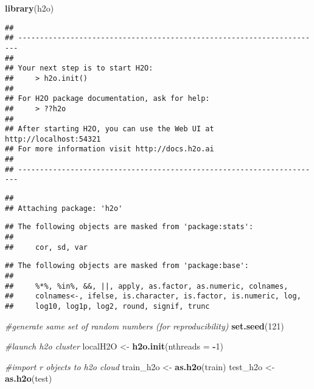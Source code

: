 \documentclass[]{article}
\newenvironment{Shaded}{\begin{snugshade}}{\end{snugshade}}
\newcommand{\KeywordTok}[1]{\textcolor[rgb]{0.13,0.29,0.53}{\textbf{#1}}}
\newcommand{\DataTypeTok}[1]{\textcolor[rgb]{0.13,0.29,0.53}{#1}}
\newcommand{\DecValTok}[1]{\textcolor[rgb]{0.00,0.00,0.81}{#1}}
\newcommand{\StringTok}[1]{\textcolor[rgb]{0.31,0.60,0.02}{#1}}
\newcommand{\CommentTok}[1]{\textcolor[rgb]{0.56,0.35,0.01}{\textit{#1}}}
\newcommand{\OperatorTok}[1]{\textcolor[rgb]{0.81,0.36,0.00}{\textbf{#1}}}
\newcommand{\NormalTok}[1]{#1}
\begin{document}
\begin{Shaded}
\begin{Highlighting}[]
\KeywordTok{library}\NormalTok{(h2o)}
\end{Highlighting}
\end{Shaded}

\begin{verbatim}
## 
## ----------------------------------------------------------------------
## 
## Your next step is to start H2O:
##     > h2o.init()
## 
## For H2O package documentation, ask for help:
##     > ??h2o
## 
## After starting H2O, you can use the Web UI at http://localhost:54321
## For more information visit http://docs.h2o.ai
## 
## ----------------------------------------------------------------------
\end{verbatim}

\begin{verbatim}
## 
## Attaching package: 'h2o'
\end{verbatim}

\begin{verbatim}
## The following objects are masked from 'package:stats':
## 
##     cor, sd, var
\end{verbatim}

\begin{verbatim}
## The following objects are masked from 'package:base':
## 
##     %*%, %in%, &&, ||, apply, as.factor, as.numeric, colnames,
##     colnames<-, ifelse, is.character, is.factor, is.numeric, log,
##     log10, log1p, log2, round, signif, trunc
\end{verbatim}

\begin{Shaded}
\begin{Highlighting}[]
\CommentTok{#generate same set of random numbers (for reproducibility)}
\KeywordTok{set.seed}\NormalTok{(}\DecValTok{121}\NormalTok{)}

\CommentTok{#launch h2o cluster}
\NormalTok{localH2O <-}\StringTok{ }\KeywordTok{h2o.init}\NormalTok{(}\DataTypeTok{nthreads =} \OperatorTok{-}\DecValTok{1}\NormalTok{)}


\CommentTok{#import r objects to h2o cloud}
\NormalTok{train_h2o <-}\StringTok{ }\KeywordTok{as.h2o}\NormalTok{(train)}
\NormalTok{test_h2o <-}\StringTok{ }\KeywordTok{as.h2o}\NormalTok{(test)}
\end{Highlighting}
\end{Shaded}
\end{document}
